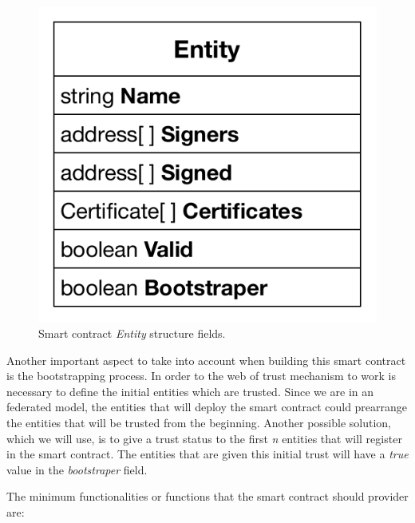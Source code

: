 \begin{figure}
  \centering
  \includegraphics[scale=0.5]{Figures/entity-structure.pdf}
  \caption{Smart contract \textit{Entity} structure fields.}
\label{fig:entity-structure}
\end{figure}

Another important aspect to take into account when building this smart contract is the bootstrapping process.
In order to the web of trust mechanism to work is necessary to define the initial entities which are trusted.
Since we are in an federated model, the entities that will deploy the smart contract could prearrange the entities that will be trusted from the beginning.
Another possible solution, which we will use, is to give a trust status to the first \textit{n} entities that will register in the smart contract.
The entities that are given this initial trust will have a \textit{true} value in the \textit{bootstraper} field.

The minimum functionalities or functions that the smart contract should provider are:

